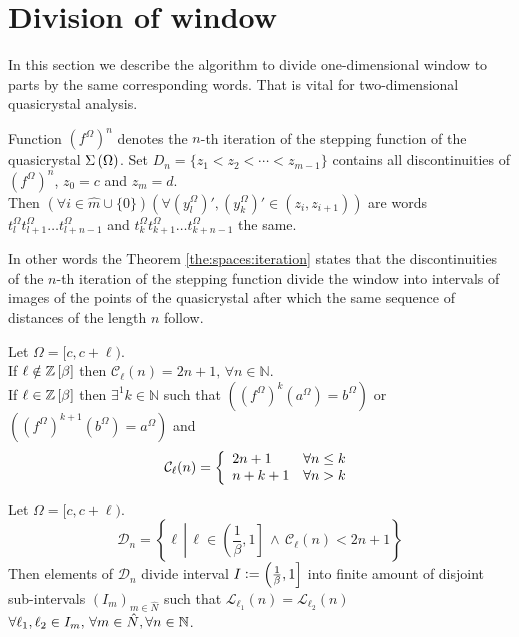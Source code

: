 \documentclass[text.tex]{subfiles}
\begin{document}
\section{Division of window}%
In this section we describe the algorithm to divide one-dimensional window to parts by the same corresponding words. That is vital for two-dimensional quasicrystal analysis.

\begin{theorem}
\label{the:spaces:iteration}
Function ${(f^\Omega)}^n$ denotes the $n$-th iteration of the stepping function of the quasicrystal $\Sigma\left(\Omega\right)$. Set $D_n = \{z_1 < z_2 < \dotsb < z_{m-1}\}$ contains all discontinuities of ${(f^\Omega)}^n$, $z_0 = c$ and $z_m = d$.\\
Then $(\forall i \in \widehat{m}\cup\{0\})(\forall {\left(y_l^\Omega\right)}' ,{\left(y_k^\Omega\right)}' \in (z_i, z_{i+1}))$ are words $t_l^\Omega t_{l+1}^\Omega \dotso t_{l+n-1}^\Omega$ and $t_k^\Omega t_{k+1}^\Omega \dotso t_{k+n-1}^\Omega$ the same.
\end{theorem}

\begin{remark}
In other words the Theorem \ref{the:spaces:iteration} states that the discontinuities of the $n$-th iteration of the stepping function divide the window into intervals of images of the points of the quasicrystal after which the same sequence of distances of the length $n$ follow.
\end{remark}

\begin{theorem}
\label{the:complexity}
Let $\Omega = [c,c+\ell)$.\\
If $\ell \notin \mathbb{Z}\left[\beta\right]$ then $\mathcal{C}_{\ell}(n) = 2n+1,\, \forall n\in\mathbb{N}$. \\
If $\ell \in \mathbb{Z}\left[\beta\right]$ then $\exists^1 k \in \mathbb{N}$ such that $\left({(f^\Omega)}^{k}(a^\Omega) = b^\Omega\right)$ or $\left({(f^\Omega)}^{k+1}(b^\Omega) = a^\Omega\right)$ and 
$$\mathcal{C}_{\ell}(n) = \left\{
	\begin{array}{l l}
		2n+1	&	\forall n\leq k \\
		n+k+1	&	\forall n > k
	\end{array}
	\right.
$$
\end{theorem}

\begin{theorem}
\label{the:sameSpaces}
Let $\Omega = [c,c+\ell)$.
$$\mathcal{D}_n = \left\{ \ell\,\left|\, \ell\in \left(\frac{1}{\beta},1\right] \,\wedge\, \mathcal{C}_\ell(n) < 2n+1 \right.\right\}$$
Then elements of $\mathcal{D}_n$ divide interval $I \vcentcolon= \left(\frac{1}{\beta},1\right]$ into finite amount of disjoint sub-intervals $(I_m)_{m\in\hat{N}}$ such that $\mathcal{L}_{\ell_1}(n) = \mathcal{L}_{\ell_2}(n)$ $\forall \ell_1, \ell_2 \in I_m,\, \forall m\in\hat{N}, \forall n\in\mathbb{N}$.
\end{theorem}
\end{document}
